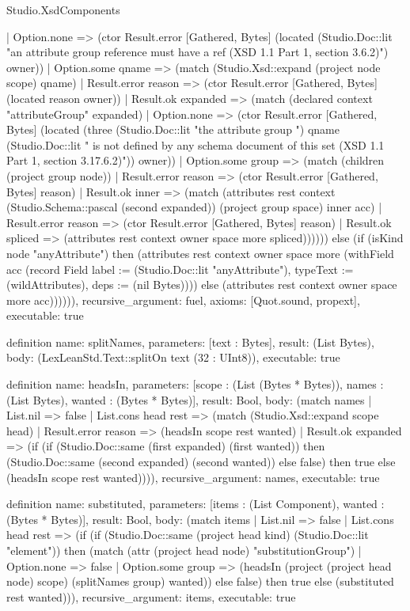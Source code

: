 \begin{lexlean}{Studio.XsdComponents}
\begin{semanticmodule}
{        | Option.none => (ctor Result.error [Gathered, Bytes] (located (Studio.Doc::lit "an attribute group reference must have a ref (XSD 1.1 Part 1, section 3.6.2)") owner))
        | Option.some qname => (match (Studio.Xsd::expand (project node scope) qname)
          | Result.error reason => (ctor Result.error [Gathered, Bytes] (located reason owner))
          | Result.ok expanded => (match (declared context "attributeGroup" expanded)
            | Option.none => (ctor Result.error [Gathered, Bytes] (located (three (Studio.Doc::lit "the attribute group ") qname (Studio.Doc::lit " is not defined by any schema document of this set (XSD 1.1 Part 1, section 3.17.6.2)")) owner))
            | Option.some group => (match (children (project group node))
              | Result.error reason => (ctor Result.error [Gathered, Bytes] reason)
              | Result.ok inner => (match (attributes rest context (Studio.Schema::pascal (second expanded)) (project group space) inner acc)
                | Result.error reason => (ctor Result.error [Gathered, Bytes] reason)
                | Result.ok spliced => (attributes rest context owner space more spliced)))))) else (if (isKind node "anyAttribute") then (attributes rest context owner space more (withField acc (record Field {label := (Studio.Doc::lit "anyAttribute"), typeText := (wildAttributes), deps := (nil Bytes)}))) else (attributes rest context owner space more acc)))))),
  recursive_argument: fuel,
  axioms: [Quot.sound, propext],
  executable: true
}

definition{
  name: splitNames,
  parameters: [text : Bytes],
  result: (List Bytes),
  body: (LexLeanStd.Text::splitOn text (32 : UInt8)),
  executable: true
}

definition{
  name: headsIn,
  parameters: [scope : (List (Bytes * Bytes)), names : (List Bytes), wanted : (Bytes * Bytes)],
  result: Bool,
  body: (match names
    | List.nil => false
    | List.cons head rest => (match (Studio.Xsd::expand scope head)
      | Result.error reason => (headsIn scope rest wanted)
      | Result.ok expanded => (if (if (Studio.Doc::same (first expanded) (first wanted)) then (Studio.Doc::same (second expanded) (second wanted)) else false) then true else (headsIn scope rest wanted)))),
  recursive_argument: names,
  executable: true
}

definition{
  name: substituted,
  parameters: [items : (List Component), wanted : (Bytes * Bytes)],
  result: Bool,
  body: (match items
    | List.nil => false
    | List.cons head rest => (if (if (Studio.Doc::same (project head kind) (Studio.Doc::lit "element")) then (match (attr (project head node) "substitutionGroup")
      | Option.none => false
      | Option.some group => (headsIn (project (project head node) scope) (splitNames group) wanted)) else false) then true else (substituted rest wanted))),
  recursive_argument: items,
  executable: true
}


\end{semanticmodule}
\end{lexlean}
